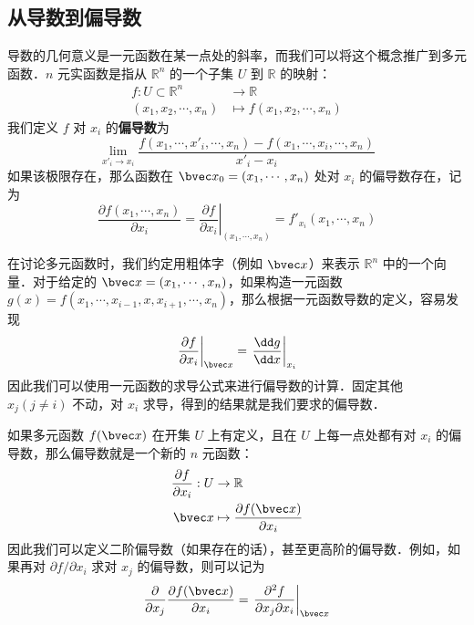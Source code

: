 
\subsection{从导数到偏导数}
导数的几何意义是一元函数在某一点处的斜率，而我们可以将这个概念推广到多元函数．$n$ 元实函数是指从 $\mathbb{R} ^n$ 的一个子集 $U$ 到 $\mathbb{R}$ 的映射：
\begin{equation}
\begin{aligned}
f:U\subset \mathbb{R} ^n&\rightarrow \mathbb{R}\\
(x_1,x_2,\cdots,x_n)&\mapsto f(x_1,x_2,\cdots,x_n)
\end{aligned}
\end{equation}
我们定义 $f$ 对 $x_i$ 的\textbf{偏导数}为
\begin{equation}
\lim\limits_{x'_i\rightarrow x_{i}}\frac{f(x_1,\cdots,x'_i,\cdots,x_n)-f(x_1,\cdots,x_i,\cdots,x_n)}{x'_i-x_i}
\end{equation}
如果该极限存在，那么函数在 $\bvec x_0=(x_1,\cdots,x_n)$ 处对 $x_i$ 的偏导数存在，记为
\begin{equation}
\frac{\partial f(x_1,\cdots,x_n)}{\partial x_i}=\left.\frac{\partial f}{\partial x_i}\right|_{(x_1,\cdots,x_n)}=f'_{x_i}(x_1,\cdots,x_n)
\end{equation}

在讨论多元函数时，我们约定用粗体字（例如 $\bvec x$）来表示 $\mathbb{R}^n$ 中的一个向量．对于给定的 $\bvec x=(x_1,\cdots,x_n)$，如果构造一元函数 $g(x)=f(x_1,\cdots,x_{i-1},x,x_{i+1},\cdots,x_n)$，那么根据一元函数导数的定义，容易发现
\begin{equation}
\left.\frac{\partial f}{\partial x_i}\right|_{\bvec x}=\left.\frac{\dd g}{\dd x}\right|_{x_i}
\end{equation}
因此我们可以使用一元函数的求导公式来进行偏导数的计算．固定其他 $x_j(j\neq i)$ 不动，对 $x_i$ 求导，得到的结果就是我们要求的偏导数．

如果多元函数 $f(\bvec x)$ 在开集 $U$ 上有定义，且在 $U$ 上每一点处都有对 $x_i$ 的偏导数，那么偏导数就是一个新的 $n$ 元函数：
\begin{equation}
\begin{aligned}
\frac{\partial f}{\partial x_i}: U&\rightarrow \mathbb{R}\\
\bvec x&\mapsto \frac{\partial f(\bvec x)}{\partial x_i}
\end{aligned}
\end{equation}
因此我们可以定义二阶偏导数（如果存在的话），甚至更高阶的偏导数．例如，如果再对 $\partial f/\partial x_i$ 求对 $x_j$ 的偏导数，则可以记为
\begin{equation}
\frac{\partial}{\partial x_j} \frac{\partial f(\bvec x)}{\partial x_i}=\left.\frac{\partial^2 f}{\partial x_j\partial x_i }\right|_{\bvec x}
\end{equation}

